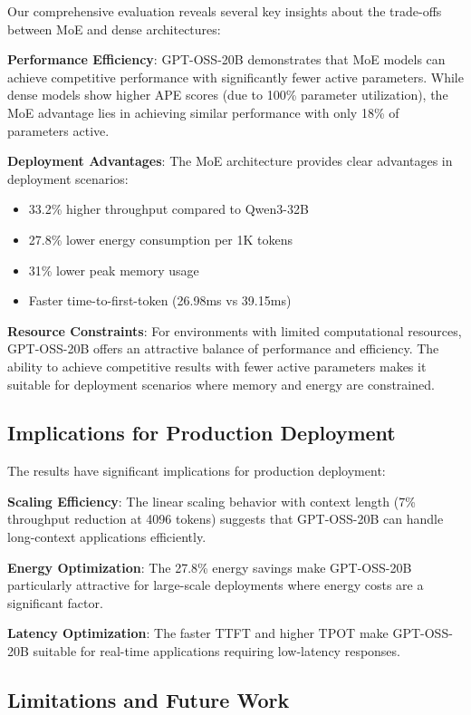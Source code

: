 \documentclass[11pt]{article}
\begin{document}
Our comprehensive evaluation reveals several key insights about the trade-offs between MoE and dense architectures:

\textbf{Performance Efficiency}: GPT-OSS-20B demonstrates that MoE models can achieve competitive performance with significantly fewer active parameters. While dense models show higher APE scores (due to 100\% parameter utilization), the MoE advantage lies in achieving similar performance with only 18\% of parameters active.

\textbf{Deployment Advantages}: The MoE architecture provides clear advantages in deployment scenarios:
\begin{itemize}
    \item 33.2\% higher throughput compared to Qwen3-32B
    \item 27.8\% lower energy consumption per 1K tokens
    \item 31\% lower peak memory usage
    \item Faster time-to-first-token (26.98ms vs 39.15ms)
\end{itemize}

\textbf{Resource Constraints}: For environments with limited computational resources, GPT-OSS-20B offers an attractive balance of performance and efficiency. The ability to achieve competitive results with fewer active parameters makes it suitable for deployment scenarios where memory and energy are constrained.

\subsection{Implications for Production Deployment}

The results have significant implications for production deployment:

\textbf{Scaling Efficiency}: The linear scaling behavior with context length (7\% throughput reduction at 4096 tokens) suggests that GPT-OSS-20B can handle long-context applications efficiently.

\textbf{Energy Optimization}: The 27.8\% energy savings make GPT-OSS-20B particularly attractive for large-scale deployments where energy costs are a significant factor.

\textbf{Latency Optimization}: The faster TTFT and higher TPOT make GPT-OSS-20B suitable for real-time applications requiring low-latency responses.

\subsection{Limitations and Future Work}
\end{document}
